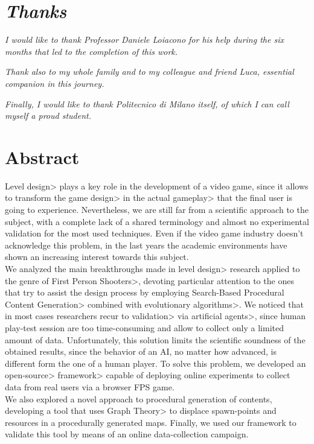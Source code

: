 \chapter{\textit{Thanks}}

\textit{I would like to thank Professor Daniele Loiacono for his help during the six months that led to the completion of this work.}

\par \mbox{}

\textit{Thank also to my whole family and to my colleague and friend Luca, essential companion in this journey.}

\par \mbox{}

\textit{Finally, I would like to thank Politecnico di Milano itself, of which I can call myself a proud student.}

\par \mbox{}

\textit{}

\chapter{Abstract}

\<Level design> plays a key role in the development of a video game, since it allows to transform the \<game design> in the actual \<gameplay> that the final user is going to experience. Nevertheless, we are still far from a scientific approach to the subject, with a complete lack of a shared terminology and almost no experimental validation for the most used techniques. Even if the video game industry doesn't acknowledge this problem, in the last years the academic environments have shown an increasing interest towards this subject. \\
We analyzed the main breakthroughs made in \<level design> research applied to the genre of \<First Person Shooters>, devoting particular attention to the ones that try to assist the design process by employing \<Search-Based Procedural Content Generation> combined with \<evolutionary algorithms>. We noticed that in most cases researchers recur to \<validation> via \<artificial agents>, since human play-test session are too time-consuming and allow to collect only a limited amount of data. Unfortunately, this solution limits the scientific soundness of the obtained results, since the behavior of an AI, no matter how advanced, is different form the one of a human player. To solve this problem, we developed an \<open-source> \<framework> capable of deploying online experiments to collect data from real users via a browser FPS game. \\
We also explored a novel approach to procedural generation of contents, developing a tool that uses \<Graph Theory> to displace spawn-points and resources in a procedurally generated maps. Finally, we used our framework to validate this tool by means of an online data-collection campaign. 

